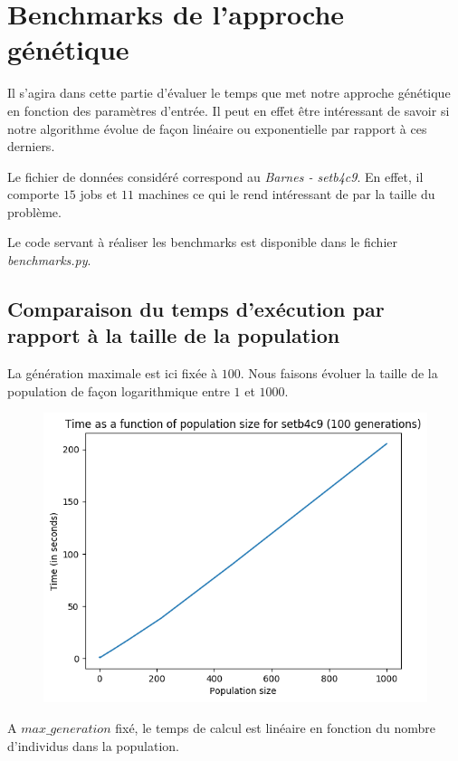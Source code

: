 \section{Benchmarks de l'approche génétique}

Il s'agira dans cette partie d'évaluer le temps que met notre approche génétique en fonction des paramètres d'entrée. Il peut en effet être intéressant de savoir si notre algorithme évolue de façon linéaire ou exponentielle par rapport à ces derniers.

Le fichier de données considéré correspond au \textit{Barnes - setb4c9}. En effet, il comporte $15$ jobs et $11$ machines ce qui le rend intéressant de par la taille du problème.

Le code servant à réaliser les benchmarks est disponible dans le fichier \textit{benchmarks.py}.

\subsection{Comparaison du temps d'exécution par rapport à la taille de la population}

La génération maximale est ici fixée à $100$. Nous faisons évoluer la taille de la population de façon logarithmique entre $1$ et $1000$.

\begin{figure}[!h]
    \centering
    \includegraphics[]{report/Pictures/setb4c9_benchmarks_population.png}
\end{figure}

A $max\_generation$ fixé, le temps de calcul est linéaire en fonction du nombre d'individus dans la population.

